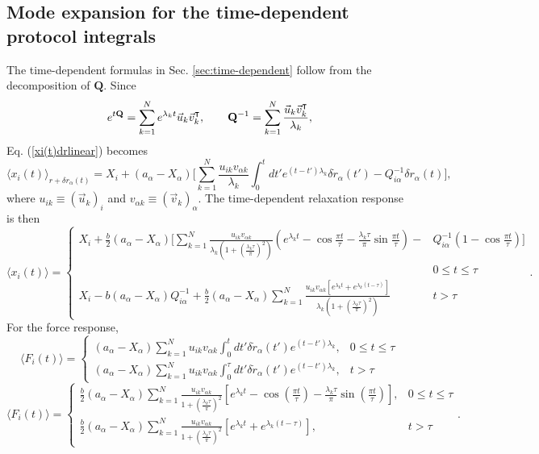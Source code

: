 \subsection*{Mode expansion for the time-dependent protocol integrals}
The time-dependent formulas in Sec. \ref{sec:time-dependent} follow from the decomposition of $\mathbf{Q}$. Since
\begin{equation}
e^{t{\bf Q}}=\sum_{k=1}^N e^{\lambda_k t}{\vec u_k}{\vec v_k}^\intercal,
\qquad
{\bf Q}^{-1}=\sum_{k=1}^N \frac{{\vec u_k}{\vec v_k}^\intercal}{\lambda_k},
\end{equation}
Eq. (\ref{xi(t)drlinear}) becomes
\begin{equation}
\langle x_i(t)\rangle_{r+\delta r_\alpha(t)}=X_i+(a_\alpha-X_\alpha)\bigg[
\sum_{k=1}^N \frac{u_{ik}v_{\alpha k}}{\lambda_k}\int_0^t dt'
e^{(t-t')\lambda_k}\delta{\dot r}_\alpha(t')
-Q^{-1}_{i\alpha}\delta r_\alpha(t)\bigg],
\label{xi(t)drlinearb}
\end{equation}
where $u_{ik}\equiv({\vec u_k})_i$ and $v_{\alpha k}\equiv({\vec v_k})_\alpha$.
The time-dependent relaxation response is then
\begin{equation}
      \langle x_i(t)\rangle=\begin{cases}  X_i+ \frac{b}{2} (a_\alpha-X_\alpha)\bigg[\sum_{k=1}^N\frac{u_{ik}v_{\alpha k}}{\lambda_k(1+(\frac{\lambda_k\tau}{\pi})^2)}\left(e^{\lambda_kt}-\cos\frac{\pi t}{\tau}-\frac{\lambda_k\tau}{\pi}\sin\frac{\pi t}{\tau}  \right)-&Q^{-1}_{i\alpha} (1-\cos\frac{\pi t}{\tau})\bigg] \\
     & 0\leq t\leq\tau\\
     X_i-b (a_\alpha-X_\alpha)Q^{-1}_{i\alpha}+\frac{b}{2} (a_\alpha-X_\alpha)\sum_{k=1}^N\frac{u_{ik}v_{\alpha k}[ e^{\lambda_kt}+e^{\lambda_k(t-\tau)}]}{\lambda_k(1+(\frac{\lambda_k\tau}{\pi})^2)} &t>\tau
     \end{cases}.
\end{equation}
For the force response,
\begin{equation}
\langle { F}_i(t)\rangle = \begin{cases}  (a_\alpha-X_\alpha)\sum_{k=1}^N u_{ik}v_{\alpha k}\int_0^tdt' \delta {\dot r}_\alpha(t')e^{(t-t')\lambda_k}, &0\leq t\leq\tau\\
(a_\alpha-X_\alpha)\sum_{k=1}^N u_{ik}v_{\alpha k}\int_0^\tau dt' \delta {\dot r}_\alpha(t')e^{(t-t')\lambda_k}, & t>\tau
\end{cases}
\end{equation}
\begin{equation}
\langle { F}_i(t)\rangle= \begin{cases} \frac{b}{2}(a_\alpha-X_\alpha)\sum_{k=1}^N \frac{u_{ik}v_{\alpha k}}{1+\left(\frac{\lambda_k\tau}{\pi}\right)^2}\left[ e^{\lambda_k t} - \cos\left( \frac{\pi t}{\tau} \right) - \frac{\lambda_k \tau}{\pi}\sin\left( \frac{\pi t}{\tau} \right) \right], &0\leq t\leq\tau\\
\frac{b}{2}(a_\alpha-X_\alpha)\sum_{k=1}^N \frac{u_{ik}v_{\alpha k}}{1+\left(\frac{\lambda_k\tau}{\pi}\right)^2} \left[ e^{\lambda_k t}+e^{\lambda_k(t-\tau)} \right], & t>\tau
\end{cases}.
\end{equation}
